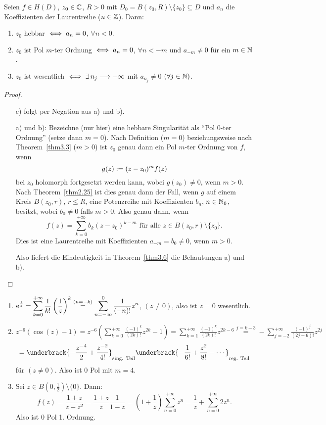 \documentclass[a4paper,twoside,DIV15,BCOR12mm]{scrbook}
\begin{document}
\begin{kor}\label{kor3.7}
Seien $f\in H(D)$, $z_0\in\mathbb{C}$, $R>0$ mit $D_0=B(z_0,R)\setminus\{z_0\}\subseteq D$ und $a_n$ die Koeffizienten der Laurentreihe ($n\in\mathbb{Z}$). Dann:
\begin{enumerate}
\item $z_0$ hebbar $\iff a_n=0$, $\forall n<0$.
\item $z_0$ ist Pol $m$-ter Ordnung $\iff a_n=0$, $\forall n<-m$ und $a_{-m}\neq 0$ für ein $m\in\mathbb{N}$.
\item $z_0$ ist wesentlich $\iff\exists\,n_j\longrightarrow -\infty$ mit $a_{n_j}\neq 0$ $(\forall j\in\mathbb{N})$.
\end{enumerate}
\end{kor}

\begin{proof}\begin{itemize}
\item [c)] folgt per Negation aus a) und b).
\item [a)] und b): Bezeichne (nur hier) eine hebbare Singularität als ``Pol 0-ter Ordnung'' (setze dann $m=0$). Nach Definition ($m=0$) beziehungsweise nach Theorem~\ref{thm3.3} ($m>0$) ist $z_0$ genau dann ein Pol $m$-ter Ordnung von $f$, wenn
\[g(z):= (z-z_0)^mf(z)\]
bei $z_0$ holomorph fortgesetzt werden kann, wobei $g(z_0)\neq 0$, wenn $m>0$. Nach Theorem~\ref{thm2.25} ist dies genau dann der Fall, wenn $g$ auf einem Kreis $B(z_0,r)$, $r\leq R$, eine Potenzreihe mit Koeffizienten $b_n$, $n\in\mathbb{N}_0$, besitzt, wobei $b_0\neq 0$ falls $m>0$. Also genau dann, wenn
\[f(z)=\sum_{k=0}^{+\infty}b_k(z-z_0)^{k-m}\text{ für alle }z\in B(z_0,r)\setminus\{z_0\}.\]
Dies ist eine Laurentreihe mit Koeffizienten $a_{-m}=b_0\neq 0$, wenn $m>0$.

Also liefert die Eindeutigkeit in Theorem~\ref{thm3.6} die Behautungen a) und b).\qedhere
\end{itemize}
\end{proof}

\begin{bsp}\label{bsp3.8}\begin{enumerate}
\item $\displaystyle\mathrm{e}^{\frac{1}{z}}=\sum_{k=0}^{+\infty}\frac{1}{k!}\left(\frac{1}{z}\right)^k \overset{(n=-k)}{=}\sum_{n=-\infty}^{0}\frac{1}{(-n)!}z^n$, $(z\neq 0)$, also ist $z=0$ wesentlich.
\item $\displaystyle z^{-6}(\cos(z)-1)=z^{-6}\left(\sum_{k=0}^{+\infty}\frac{(-1)^k}{(2k)!}z^{2k}-1\right) = \sum_{k=1}^{+\infty}\frac{(-1)^k}{(2k)!}z^{2k-6}\overset{j=k-3}{=}-\sum_{j=-2}^{+\infty}\frac{(-1)^j}{(2j+6)!}z^{2j}$
\[=\underbrack{-\frac{z^{-4}}{2}+\frac{z^{-2}}{4!}}_{\text{sing. Teil}}\underbrack{-\frac{1}{6!}+\frac{z^2}{8!}-\dotsb}_{\text{reg. Teil}}\]
für $(z\neq 0)$. Also ist 0 Pol mit $m=4$.
\item Sei $z\in B(0,\frac{1}{2})\setminus\{0\}$. Dann:
\[f(z)=\frac{1+z}{z-z^2} = \frac{1+z}{z}\frac{1}{1-z}=\left(1+\frac{1}{z}\right)\sum_{n=0}^{+\infty}z^n=\frac{1}{z}+\sum_{n=0}^{+\infty}2z^n.\]
Also ist 0 Pol 1. Ordnung.
\end{enumerate}\end{bsp}
\end{document}
